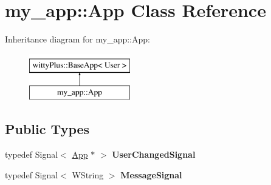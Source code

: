 \hypertarget{classmy__app_1_1App}{
\section{my\_\-app::App Class Reference}
\label{classmy__app_1_1App}
}
Inheritance diagram for my\_\-app::App:\begin{figure}[H]
\begin{center}
\leavevmode
\includegraphics[height=2.000000cm]{classmy__app_1_1App}
\end{center}
\end{figure}
\subsection*{Public Types}
\begin{DoxyCompactItemize}
\item 
\hypertarget{classmy__app_1_1App_a697879e0d77597364d66bbeb7051473b}{
typedef Signal$<$ \hyperlink{classmy__app_1_1App}{App} $\ast$ $>$ {\bfseries UserChangedSignal}}
\label{classmy__app_1_1App_a697879e0d77597364d66bbeb7051473b}

\item 
\hypertarget{classmy__app_1_1App_a7dcc0787c54a24462a18988a6e4c5d13}{
typedef Signal$<$ WString $>$ {\bfseries MessageSignal}}
\label{classmy__app_1_1App_a7dcc0787c54a24462a18988a6e4c5d13}

\end{DoxyCompactItemize}
